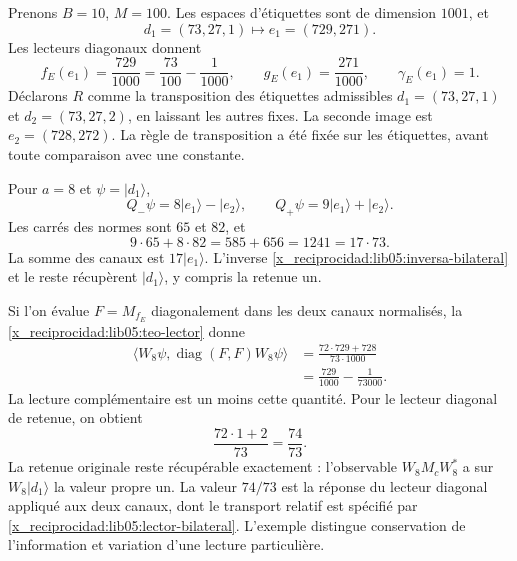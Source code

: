 Prenons \(B=10\), \(M=100\). Les espaces d’étiquettes sont de
dimension \(1001\), et
\begin{equation}
 d_1=(73,27,1)\longmapsto e_1=(729,271).
 \label{x_reciprocidad:lib05:ejemplo-etiqueta}
\end{equation}
Les lecteurs diagonaux donnent
\begin{equation}
 f_E(e_1)=\frac{729}{1000}
 =\frac{73}{100}-\frac1{1000},\qquad
 g_E(e_1)=\frac{271}{1000},\qquad \gamma_E(e_1)=1.
 \label{x_reciprocidad:lib05:ejemplo-lectores}
\end{equation}
Déclarons \(R\) comme la transposition des étiquettes
admissibles \(d_1=(73,27,1)\) et \(d_2=(73,27,2)\), en laissant
les autres fixes. La seconde image est \(e_2=(728,272)\).
La règle de transposition a été fixée sur les étiquettes, avant
toute comparaison avec une constante.

Pour \(a=8\) et \(\psi=|d_1\rangle\),
\begin{equation}
 Q_-\psi=8|e_1\rangle-|e_2\rangle,\qquad
 Q_+\psi=9|e_1\rangle+|e_2\rangle.
 \label{x_reciprocidad:lib05:ejemplo-canales}
\end{equation}
Les carrés des normes sont \(65\) et \(82\), et
\begin{equation}
 9\cdot65+8\cdot82=585+656=1241=17\cdot73.
 \label{x_reciprocidad:lib05:ejemplo-balance}
\end{equation}
La somme des canaux est \(17|e_1\rangle\). L’inverse
\eqref{x_reciprocidad:lib05:inversa-bilateral} et le reste récupèrent
\(|d_1\rangle\), y compris la retenue un.

Si l’on évalue \(F=M_{f_E}\) diagonalement dans les deux canaux
normalisés, la \cref{x_reciprocidad:lib05:teo-lector} donne
\begin{equation}
 \begin{split}
 \langle W_8\psi,\operatorname{diag}(F,F)W_8\psi\rangle
 &=\frac{72\cdot729+728}{73\cdot1000}\\
 &=\frac{729}{1000}-\frac1{73000}.
 \end{split}
 \label{x_reciprocidad:lib05:ejemplo-fraccion}
\end{equation}
La lecture complémentaire est un moins cette quantité. Pour le
lecteur diagonal de retenue, on obtient
\begin{equation}
 \frac{72\cdot1+2}{73}=\frac{74}{73}.
 \label{x_reciprocidad:lib05:ejemplo-acarreo}
\end{equation}
La retenue originale reste récupérable exactement :
l’observable \(W_8M_cW_8^*\) a sur \(W_8|d_1\rangle\)
la valeur propre un. La valeur \(74/73\) est la réponse du
lecteur diagonal appliqué aux deux canaux, dont le transport relatif
est spécifié par \eqref{x_reciprocidad:lib05:lector-bilateral}. L’exemple
distingue conservation de l’information et variation d’une lecture
particulière.

